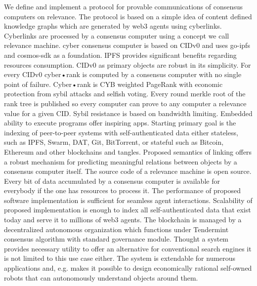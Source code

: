 \documentclass[8pt,oneside]{amsart}
\newcommand{\code}[1]{{\PlayBold #1}}
\begin{document}
We define and implement a protocol for provable communications of consensus computers on relevance.
The protocol is based on a simple idea of content defined knowledge graphs which are generated by web3 agents using cyberlinks.
Cyberlinks are processed by a consensus computer using a concept we call relevance machine.
\code{cyber} consensus computer is based on \code{CIDv0} and uses \code{go-ipfs} and \code{cosmos-sdk} as a foundation. IPFS provides significant benefits regarding resources consumption. CIDv0 as primary objects are robust in its simplicity. For every CIDv0 cyber•rank is computed by a consensus computer with no single point of failure. Cyber•rank is CYB weighted PageRank with economic protection from sybil attacks and selfish voting. Every round merkle root of the rank tree is published so every computer can prove to any computer a relevance value for a given CID. Sybil resistance is based on bandwidth limiting. Embedded ability to execute programs offer inspiring apps. Starting primary goal is the indexing of peer-to-peer systems with self-authenticated data either stateless, such as IPFS, Swarm, DAT, Git, BitTorrent, or stateful such as Bitcoin, Ethereum and other blockchains and tangles. Proposed semantics of linking offers a robust mechanism for predicting meaningful relations between objects by a consensus computer itself. The source code of a relevance machine is open source. Every bit of data accumulated by a consensus computer is available for everybody if the one has resources to process it. The performance of proposed software implementation is sufficient for seamless agent interactions. Scalability of proposed implementation is enough to index all self-authenticated data that exist today and serve it to millions of web3 agents. The blockchain is managed by a decentralized autonomous organization which functions under Tendermint consensus algorithm with standard governance module. Thought a system provides necessary utility to offer an alternative for conventional search engines it is not limited to this use case either. The system is extendable for numerous applications and, e.g. makes it possible to design economically rational self-owned robots that can autonomously understand objects around them.
\end{document}
